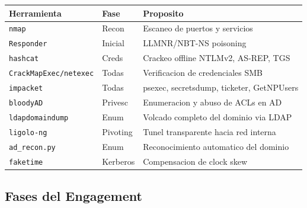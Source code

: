 \documentclass[11pt,a4paper]{article}
\begin{document}
\begin{center}
\begin{tabular}{llp{6.5cm}}
\toprule
\textbf{Herramienta} & \textbf{Fase} & \textbf{Proposito} \\
\midrule
\texttt{nmap}                   & Recon       & Escaneo de puertos y servicios \\
\texttt{Responder}              & Inicial     & LLMNR/NBT-NS poisoning \\
\texttt{hashcat}                & Creds       & Crackeo offline NTLMv2, AS-REP, TGS \\
\texttt{CrackMapExec/netexec}   & Todas       & Verificacion de credenciales SMB \\
\texttt{impacket}               & Todas       & psexec, secretsdump, ticketer, GetNPUsers \\
\texttt{bloodyAD}               & Privesc     & Enumeracion y abuso de ACLs en AD \\
\texttt{ldapdomaindump}         & Enum        & Volcado completo del dominio via LDAP \\
\texttt{ligolo-ng}              & Pivoting    & Tunel transparente hacia red interna \\
\texttt{ad\_recon.py}           & Enum        & Reconocimiento automatico del dominio \\
\texttt{faketime}               & Kerberos    & Compensacion de clock skew \\
\bottomrule
\end{tabular}
\end{center}

\subsection{Fases del Engagement}
\end{document}
